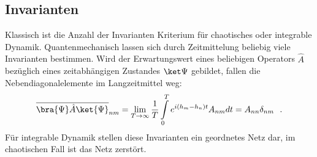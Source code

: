 \subsection{Invarianten}
Klassisch ist die Anzahl der Invarianten Kriterium für chaotisches oder integrable Dynamik.
Quantenmechanisch lassen sich durch Zeitmittelung beliebig viele Invarianten bestimmen.
Wird der Erwartungswert eines beliebigen Operators $\hat A$ bezüglich eines zeitabhängigen Zustandes $\ket \Psi$ gebildet, fallen die Nebendiagonalelemente im Langzeitmittel weg:
\begin{align}
 \overline{\bra{\Psi} \hat A \ket{\Psi}}_{nm} = \lim \limits_{T \rightarrow \infty}\frac{1}{T}\int\limits_0^T e^{i(h_m-h_n)t}A_{nm}dt = A_{nn}\delta_{nm}~~.
\end{align}
Für integrable Dynamik stellen diese Invarianten ein geordnetes Netz dar, im chaotischen Fall ist das Netz zerstört.
